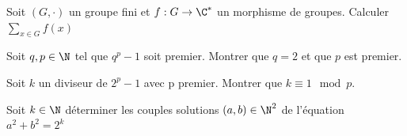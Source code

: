\documentclass[11pt,a4paper]{article}
\begin{document}
\begin{exercise}
Soit $(G, \cdot)$ un groupe fini et $f:G\to \C^*$ un morphisme de groupes.
Calculer $\displaystyle\sum_{x\in G} f(x)$
\end{exercise}

\begin{exercise}
Soit $q,p\in\N$ tel que $q^p-1$ soit premier.
Montrer que $q=2$ et que $p$ est premier.
\end{exercise}

\begin{exercise}
Soit $k$ un diviseur de $2^p-1$ avec p premier. Montrer que $k\equiv 1\mod p$.
\end{exercise}

\begin{exercise}
Soit $k\in\N$ déterminer les couples solutions $(a,b)\in\N^2$ de l'équation
$a^2+b^2=2^k$ 
\end{exercise}
\end{document}
